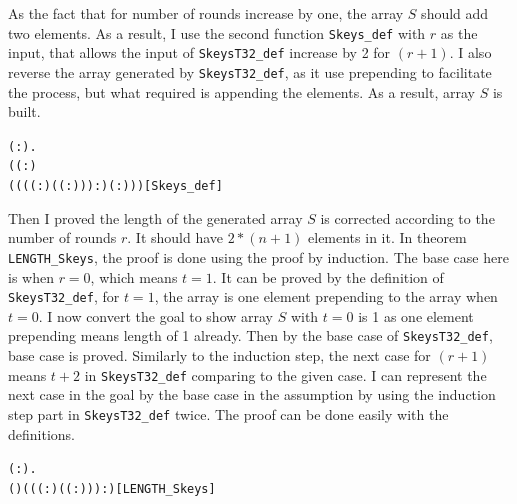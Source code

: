 \documentclass{article}
\begin{document}
As the fact that for number of rounds increase by one, the array
$S$ should add two elements. As a result, I use the second function \verb|Skeys_def| with $r$ as the input, that allows the input of \verb|SkeysT32_def|
increase by 2 for $(r+1)$. I also reverse the array generated by \verb|SkeysT32_def|, as it use prepending to facilitate the process,
but what required is appending the elements. As a result, array $S$ is built.

\begin{alltt}
\HOLTokenTurnstile{} \HOLSymConst{\HOLTokenForall{}}( :).
       \HOLSymConst{=}
       ( ( :)
          (((( :) \HOLSymConst{\HOLTokenProd{}} ( \HOLSymConst{\ensuremath{+}} ( :))) :) \HOLSymConst{\ensuremath{-}} ( :)))\hfill{[Skeys_def]}
\end{alltt}

Then I proved the length of the generated array $S$ is corrected according to the number of rounds $r$. It should have $2*(n+1)$ elements
in it. In theorem \verb|LENGTH_Skeys|, the proof is done using the proof by induction. The base case here is when $r=0$, which means $t=1$.
It can be proved by the definition of \verb|SkeysT32_def|, for $t=1$, the array is one element prepending to the array when $t=0$. I now
convert the goal to show array $S$ with $t=0$ is 1 as one element prepending means length of 1 already. Then by the base case of \verb|SkeysT32_def|,
base case is proved. Similarly to the induction step, the next case for $(r+1)$ means $t+2$ in \verb|SkeysT32_def| comparing to the
given case. I can represent the next case in the goal by the base case in the assumption by using the induction step part
in \verb|SkeysT32_def| twice. The proof can be done easily with the definitions.

\begin{alltt}
\HOLTokenTurnstile{} \HOLSymConst{\HOLTokenForall{}}( :).
      ( ) \HOLSymConst{=} ((( :) \HOLSymConst{\HOLTokenProd{}} ( \HOLSymConst{\ensuremath{+}} ( :))) :)\hfill{[LENGTH_Skeys]}
\end{alltt}
\end{document}

